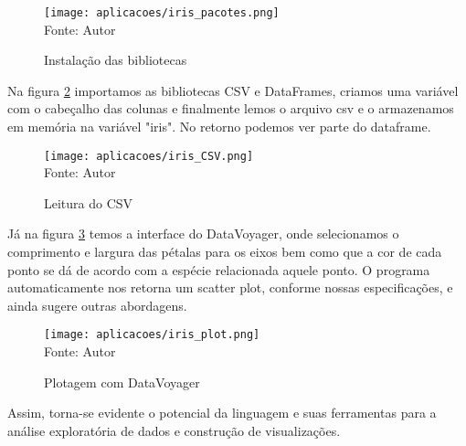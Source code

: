\begin{figure}[H]
   \begin{center}
       \caption{Instalação das bibliotecas} \label{iris_pacotes}
       \texttt{[image: aplicacoes/iris\_pacotes.png]} \\
       {\tiny \sf Fonte: Autor}
   \end{center}
\end{figure}

Na figura \ref{iris_csv} importamos as bibliotecas CSV e DataFrames, criamos uma variável com o cabeçalho das colunas e finalmente lemos o arquivo csv e o armazenamos em memória na variável "iris". No retorno podemos ver parte do dataframe.

\begin{figure}[H]
   \begin{center}
       \caption{Leitura do CSV} \label{iris_csv}
       \texttt{[image: aplicacoes/iris\_CSV.png]} \\
       {\tiny \sf Fonte: Autor}
   \end{center}
\end{figure}

Já na figura \ref{iris_plot} temos a interface do DataVoyager, onde selecionamos o comprimento e largura das pétalas para os eixos bem como que a cor de cada ponto se dá de acordo com a espécie relacionada aquele ponto. O programa automaticamente nos retorna um scatter plot, conforme nossas especificações, e ainda sugere outras abordagens. 


\begin{figure}[H]
   \begin{center}
       \caption{Plotagem com DataVoyager} \label{iris_plot}
       \texttt{[image: aplicacoes/iris\_plot.png]} \\
       {\tiny \sf Fonte: Autor}
   \end{center}
\end{figure}

Assim, torna-se evidente o potencial da linguagem e suas ferramentas para a análise exploratória de dados e construção de visualizações. 


